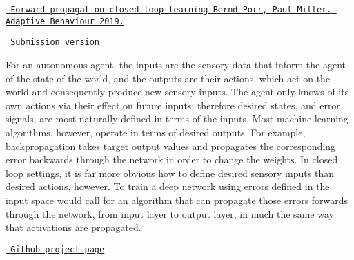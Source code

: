 \href{https://journals.sagepub.com/doi/10.1177/1059712319851070}{\texttt{ Forward propagation closed loop learning Bernd Porr, Paul Miller. Adaptive Behaviour 2019.}}

\href{https://www.berndporr.me.uk/Porr_Miller_FCL_2019_Adaptive_Behaviour.pdf}{\texttt{ Submission version}}

For an autonomous agent, the inputs are the sensory data that inform the agent of the state of the world, and the outputs are their actions, which act on the world and consequently produce new sensory inputs. The agent only knows of its own actions via their effect on future inputs; therefore desired states, and error signals, are most naturally defined in terms of the inputs. Most machine learning algorithms, however, operate in terms of desired outputs. For example, backpropagation takes target output values and propagates the corresponding error backwards through the network in order to change the weights. In closed loop settings, it is far more obvious how to define desired sensory inputs than desired actions, however. To train a deep network using errors defined in the input space would call for an algorithm that can propagate those errors forwards through the network, from input layer to output layer, in much the same way that activations are propagated.

\href{https://github.com/glasgowneuro/feedforward_closedloop_learning}{\texttt{ Github project page}} 